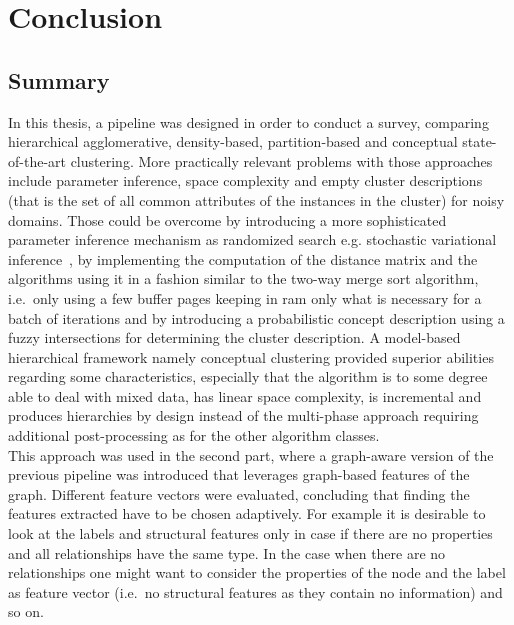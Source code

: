 \chapter{Conclusion}\label{\positionnumber}
\section{Summary}\label{\positionnumber}
In this thesis, a pipeline was designed in order to conduct a survey, comparing hierarchical agglomerative, density-based, partition-based and conceptual state-of-the-art clustering. More practically relevant problems with those approaches include parameter inference, space complexity and empty cluster descriptions (that is the set of all common attributes of the instances in the cluster) for noisy domains. Those could be overcome by introducing a more sophisticated parameter inference mechanism as randomized search e.g. stochastic variational inference~\cite{hoffman2013stochastic}, by implementing the computation of the distance matrix and the algorithms using it in a fashion similar to the two-way merge sort algorithm, i.e.~only using a few buffer pages keeping in ram only what is necessary for a batch of iterations and by introducing a probabilistic concept description using a fuzzy intersections for determining the cluster description. A model-based hierarchical framework namely conceptual clustering provided superior abilities regarding some characteristics, especially that the algorithm is to some degree able to deal with mixed data, has linear space complexity, is incremental and produces hierarchies by design instead of the multi-phase approach requiring additional post-processing as for the other algorithm classes. \\
This approach was used in the second part, where a graph-aware version of the previous pipeline was introduced that leverages graph-based features of the graph. Different feature vectors were evaluated, concluding that finding the features extracted have to be chosen adaptively. For example it is desirable to look at the labels and structural features only in case if there are no properties and all relationships have the same type. In the case when there are no relationships one might want to consider the properties of the node and the label as feature vector (i.e.~no structural features as they contain no information) and so on.

